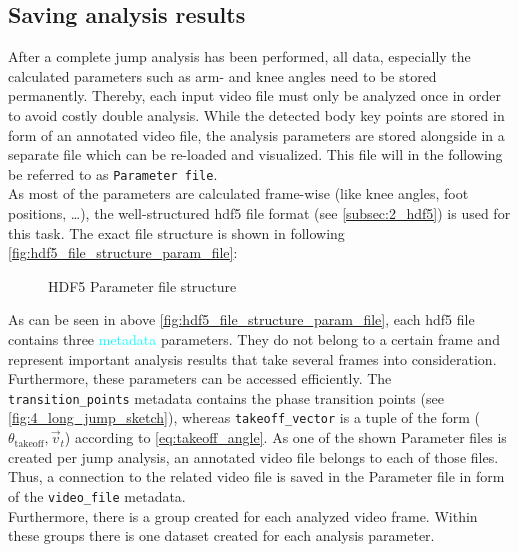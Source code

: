 \subsection{Saving analysis results}
After a complete jump analysis has been performed, all data, especially
the calculated parameters such as arm- and knee angles need to be stored
permanently.
Thereby, each input video file must only be analyzed once in order to avoid
costly double analysis.
While the detected body key points are stored in form of an annotated video
file, the analysis parameters are stored alongside in a separate file which
can be re-loaded and visualized.
This file will in the following be referred to as \texttt{Parameter file}.\\
As most of the parameters are calculated frame-wise (like knee angles, foot
positions, \dots), the well-structured hdf5 file format (see
\autoref{subsec:2_hdf5}) is used for this task.
The exact file structure is shown in following 
\autoref{fig:hdf5_file_structure_param_file}:
\begin{figure}[h!]
    \centering
    \caption[HDF5 Parameter file structure]{HDF5 Parameter file structure}
    \label{fig:hdf5_file_structure_param_file}
\end{figure}
\FloatBarrier
\noindent As can be seen in above \autoref{fig:hdf5_file_structure_param_file},
each hdf5 file contains three \textcolor{cyan}{metadata} parameters.
They do not belong to a certain frame and represent important analysis results
that take several frames into consideration.
Furthermore, these parameters can be accessed efficiently.
The \texttt{transition\_points} metadata contains the phase transition points
(see \autoref{fig:4_long_jump_sketch}), whereas \texttt{takeoff\_vector} is a
tuple of the form ($\theta_{\text{takeoff}}, \vec{{}v}_t$) according to
\autoref{eq:takeoff_angle}.
As one of the shown Parameter files is created per jump analysis, an annotated
video file belongs to each of those files.
Thus, a connection to the related video file is saved in the
Parameter file in form of the \texttt{video\_file} metadata.\\
Furthermore, there is a group created for each analyzed video frame.
Within these groups there is one dataset created for each analysis parameter.\\

